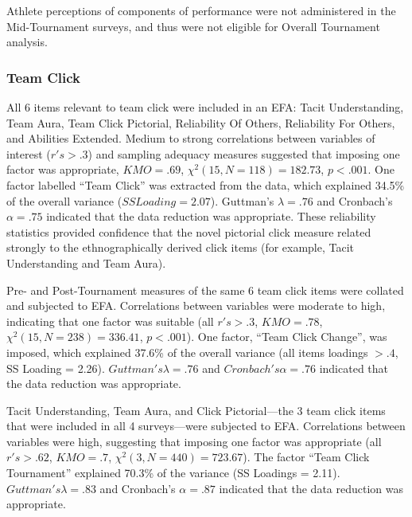 \begin{CJK}{UTF8}{gbsn}
Athlete perceptions of components of performance were not administered in the Mid-Tournament surveys, and thus were not eligible for Overall Tournament analysis.




\subsubsection{Team Click}

All 6 items relevant to team click were included in an EFA: Tacit Understanding, Team Aura, Team Click Pictorial, Reliability Of Others, Reliability For Others, and Abilities Extended.  Medium to strong correlations between variables of interest ($r's > .3$) and sampling adequacy measures suggested that imposing one factor was appropriate, $KMO =  .69$, $\chi^2(15, N = 118) = 182.73$, $p < .001$.  One factor labelled ``Team Click'' was extracted from the data, which explained 34.5\% of the overall variance ($SS Loading = 2.07$).  Guttman's $\lambda =.76$ and Cronbach's $\alpha = .75$ indicated that the data reduction was appropriate.  These reliability statistics provided confidence that the novel pictorial click measure related strongly to the ethnographically derived click items (for example, Tacit Understanding and Team Aura).


Pre- and Post-Tournament measures of the same 6 team click items were collated and subjected to EFA. Correlations between variables were moderate to high, indicating that one factor was suitable (all $r's > .3$, $KMO = .78$,$\chi^2(15, N = 238) = 336.41$, $p < .001$).  One factor, ``Team Click Change'', was imposed, which explained 37.6\% of the overall variance (all items loadings $> .4$, SS Loading = 2.26).  $Guttman's \lambda =.76$ and $Cronbach's \alpha = .76$ indicated that the data reduction was appropriate.

Tacit Understanding, Team Aura, and Click Pictorial---the 3 team click items that were included in all 4 surveys---were subjected to EFA.  Correlations between variables were high, suggesting that imposing one factor was appropriate (all $r's > .62$, $KMO = .7$, $\chi^2(3, N = 440) = 723.67$).  The factor ``Team Click Tournament'' explained 70.3\% of the variance (SS Loadings = 2.11).  $Guttman's \lambda =.83$ and Cronbach's $\alpha = .87$ indicated that the data reduction was appropriate.


\end{CJK}
